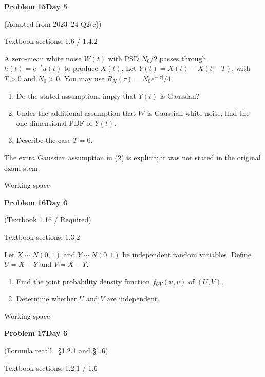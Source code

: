\documentclass[11pt]{article}
\newcommand{\qtitle}[2]{\clearpage\begin{tcolorbox}[colback=navy,colframe=navy,arc=1.5pt,boxrule=0pt]\color{white}\large\bfseries #1\hfill\small #2\end{tcolorbox}}
\begin{document}
\qtitle{Problem 15}{Day 5}
{\small\color{accentred}(Adapted from 2023--24 Q2(c))}\par\smallskip
{\small\color{muted}Textbook sections: 1.6 / 1.4.2}\par\medskip
\begin{tcolorbox}[colback=qbg,colframe=qbg,boxrule=0pt]A zero-mean white noise $W(t)$ with PSD $N_0/2$ passes through $h(t)=e^{-t}u(t)$ to produce $X(t)$. Let $Y(t)=X(t)-X(t-T)$, with $T>0$ and $N_0>0$.
You may use $R_X(\tau)=N_0e^{-|\tau|}/4$.
\begin{enumerate}\item Do the stated assumptions imply that $Y(t)$ is Gaussian?\item Under the additional assumption that $W$ is Gaussian white noise, find the one-dimensional PDF of $Y(t)$.\item Describe the case $T=0$.\end{enumerate}
The extra Gaussian assumption in (2) is explicit; it was not stated in the original exam stem.\end{tcolorbox}\smallskip\begin{workspace}\hfill{\color{linec}\footnotesize Working space}\end{workspace}
\qtitle{Problem 16}{Day 6}
{\small\color{accentred}(Textbook 1.16 / Required)}\par\smallskip
{\small\color{muted}Textbook sections: 1.3.2}\par\medskip
\begin{tcolorbox}[colback=qbg,colframe=qbg,boxrule=0pt]Let $X\sim N(0,1)$ and $Y\sim N(0,1)$ be independent random variables. Define $U=X+Y$ and $V=X-Y$.
\begin{enumerate}
\item Find the joint probability density function $f_{UV}(u,v)$ of $(U,V)$.
\item Determine whether $U$ and $V$ are independent.
\end{enumerate}\end{tcolorbox}\smallskip\begin{workspace}\hfill{\color{linec}\footnotesize Working space}\end{workspace}
\qtitle{Problem 17}{Day 6}
{\small\color{accentred}(Formula recall \textperiodcentered\ \S1.2.1 and \S1.6)}\par\smallskip
{\small\color{muted}Textbook sections: 1.2.1 / 1.6}\par\medskip
\end{document}
